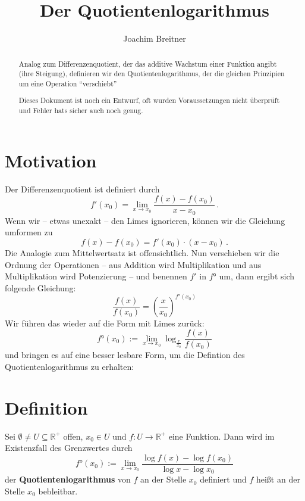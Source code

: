 \documentclass{amsart}
\begin{document}
%
%

\title{Der Quotientenlogarithmus}
\author{Joachim Breitner}

\begin{abstract}

Analog zum Differenzenquotient, der das additive Wachstum einer Funktion angibt (ihre Steigung), definieren wir den Quotientenlogarithmus, der die gleichen Prinzipien um eine Operation "`verschiebt"'

Dieses Dokument ist noch ein Entwurf, oft wurden Voraussetzungen nicht überprüft und Fehler hats sicher auch noch genug.

\end{abstract}


\maketitle

\section{Motivation}

Der Differenzenquotient ist definiert durch
\[
f'(x_0) = \lim_{x\to x_0}\frac{f(x) - f(x_0)}{x-x_0}\,.
\]
Wenn wir -- etwas unexakt -- den Limes ignorieren, können wir die Gleichung umformen zu
\[ f(x) - f(x_0) = f'(x_0)\cdot(x-x_0)\,. \]
Die Analogie zum Mittelwertsatz ist offensichtlich. Nun verschieben wir die Ordnung der Operationen -- aus Addition wird Multiplikation und aus Multiplikation wird Potenzierung -- und benennen $f'$ in $f°$ um, dann ergibt sich folgende Gleichung:
\[ \frac{f(x)}{f(x_0)} = \left(\frac x{x_0}\right)^{f°(x_0)}\]
Wir führen das wieder auf die Form mit Limes zurück:
\[ f°(x_0) := \lim_{x\to x_0} \log_{\frac x{x_0}}\frac{f(x)}{f(x_0)} \]
und bringen es auf eine besser lesbare Form, um die Defintion des Quotientenlogarithmus zu erhalten:

\section{Definition}

Sei $\emptyset \ne U\subseteq \mathbb{R}^+$ offen, $x_0\in U$ und $f:U\to\mathbb{R}^+$ eine Funktion. Dann wird im Existenzfall des Grenzwertes durch
\[ f°(x_0) := \lim_{x\to x_0} \frac{ \log f(x) - \log f(x_0) }{ \log x - \log x_0} \]
der \textbf{Quotientenlogarithmus} von $f$ an der Stelle $x_0$ definiert und $f$ heißt an der Stelle $x_0$ bebleitbar.
\end{document}
